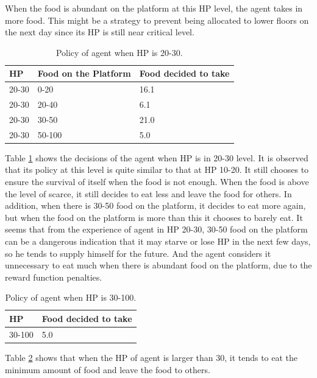 When the food is abundant on the platform at this HP level, the agent takes in more food. This might be a strategy to prevent being allocated to lower floors on the next day since its HP is still near critical level.

\begin{table}[]
\centering
\caption{Policy of agent when HP is 20-30.}
\label{2030-team2}
\begin{tabular}{@{}lll@{}}
\toprule
HP    & Food on the Platform & Food decided to take \\ \midrule
20-30 & 0-20                 & 16.1                 \\
20-30 & 20-40                & 6.1                  \\
20-30 & 30-50                & 21.0                 \\
20-30 & 50-100               & 5.0                  \\ \bottomrule
\end{tabular}
\end{table}

Table \ref{2030-team2} shows the decisions of the agent when HP is in 20-30 level. It is observed that its policy at this level is quite similar to that at HP 10-20. It still chooses to ensure the survival of itself when the food is not enough. When the food is above the level of scarce, it still decides to eat less and leave the food for others. In addition, when there is 30-50 food on the platform, it decides to eat more again, but when the food on the platform is more than this it chooses to barely eat. It seems that from the experience of agent in HP 20-30, 30-50 food on the platform can be a dangerous indication that it may starve or lose HP in the next few days, so he tends to supply himself for the future. And the agent considers it unnecessary to eat much when there is abundant food on the platform, due to the reward function penalties.

\begin{table}[]
\centering
\caption{Policy of agent when HP is 30-100.}
\label{30100-team2}
\begin{tabular}{@{}ll@{}}
\toprule
HP     & Food decided to take \\ \midrule
30-100 & 5.0                  \\ \bottomrule
\end{tabular}
\end{table}

Table \ref{30100-team2} shows that when the HP of agent is larger than 30, it tends to eat the minimum amount of food and leave the food to others.

